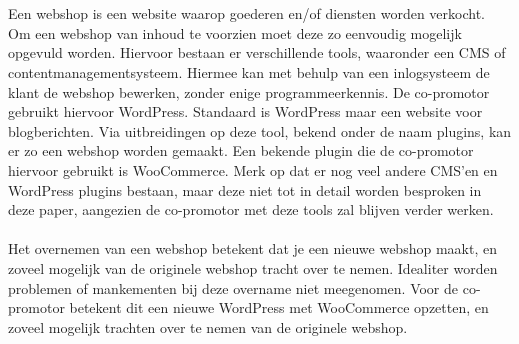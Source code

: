
\chapter{}%
\label{ch:inleiding}

%

Een webshop is een website waarop goederen en/of diensten worden verkocht. Om een webshop van inhoud te voorzien moet deze zo eenvoudig mogelijk opgevuld worden. Hiervoor bestaan er verschillende tools, waaronder een CMS of contentmanagementsysteem. Hiermee kan met behulp van een inlogsysteem de klant de webshop bewerken, zonder enige programmeerkennis. De co-promotor gebruikt hiervoor WordPress. Standaard is WordPress maar een website voor blogberichten. Via uitbreidingen op deze tool, bekend onder de naam plugins, kan er zo een webshop worden gemaakt. Een bekende plugin die de co-promotor hiervoor gebruikt is WooCommerce. Merk op dat er nog veel andere CMS'en en WordPress plugins bestaan, maar deze niet tot in detail worden besproken in deze paper, aangezien de co-promotor met deze tools zal blijven verder werken. 
\\\\
Het overnemen van een webshop betekent dat je een nieuwe webshop maakt, en zoveel mogelijk van de originele webshop tracht over te nemen. Idealiter worden problemen of mankementen bij deze overname niet meegenomen. Voor de co-promotor betekent dit een nieuwe WordPress met WooCommerce opzetten, en zoveel mogelijk trachten over te nemen van de originele webshop.

